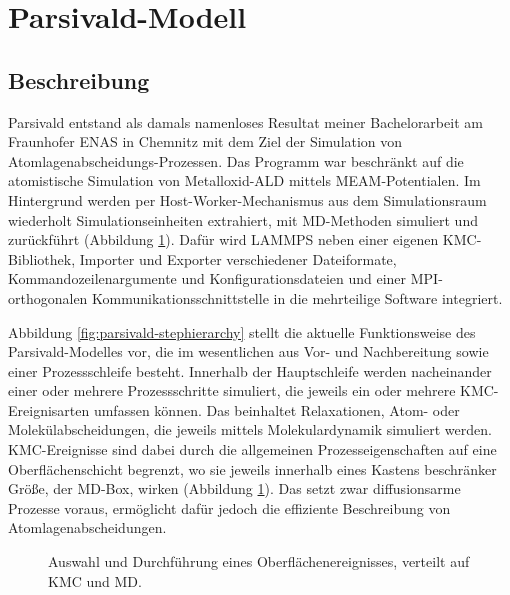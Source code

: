\section{Parsivald-Modell}
\label{sec:parsivald}


\subsection{Beschreibung}

Parsivald entstand als damals namenloses Resultat meiner Bachelorarbeit\cite{lorenz_entwicklung_2012} am Fraunhofer ENAS in Chemnitz mit dem Ziel der Simulation von Atom\-lagen\-abscheidungs-Prozessen.
Das Programm war beschränkt auf die atomistische Simulation von Metall\-oxid-ALD mittels MEAM-Potentialen.
Im Hintergrund werden per Host-Worker-Mechanismus aus dem Simulationsraum wiederholt Simulationseinheiten extrahiert, mit MD-Methoden simuliert und zurückführt (Abbildung \ref{fig:parsivald-schema}).
Dafür wird LAMMPS neben einer eigenen KMC-Bibliothek, Importer und Exporter verschiedener Dateiformate, Kommandozeilenargumente und Konfigurationsdateien und einer MPI-orthogonalen Kommunikationsschnittstelle in die mehrteilige Software integriert.

Abbildung \ref{fig:parsivald-stephierarchy} stellt die aktuelle Funktionsweise des Parsivald-Modelles vor, die im wesentlichen aus Vor- und Nachbereitung sowie einer Prozessschleife besteht.
Innerhalb der Hauptschleife werden nacheinander einer oder mehrere Prozessschritte simuliert, die jeweils ein oder mehrere KMC-Ereignisarten umfassen können.
Das beinhaltet Relaxationen, Atom- oder Molekülabscheidungen, die jeweils mittels Molekulardynamik simuliert werden.
KMC-Ereignisse sind dabei durch die allgemeinen Prozesseigenschaften auf eine Oberflächenschicht begrenzt, wo sie jeweils innerhalb eines Kastens beschränker Größe, der MD-Box, wirken (Abbildung \ref{fig:parsivald-schema}).
Das setzt zwar diffusionsarme Prozesse voraus, ermöglicht dafür jedoch die effiziente Beschreibung von Atomlagenabscheidungen.

\begin{figure}
  \centering
  \def\svgwidth{\textwidth}
  
  \caption[Parsivald-Schema]{
    Auswahl und Durchführung eines Oberflächenereignisses, verteilt auf KMC und MD.
  }
  \label{fig:parsivald-schema}
\end{figure}

